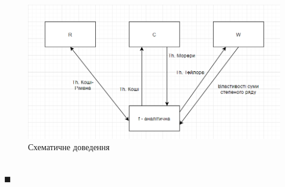 \documentclass[a4paper, 14pt]{extarticle}
\def\hugespace{\vspace{5mm} \\}
\begin{document}
	\begin{figure}[h]
	\includegraphics[scale = 0.7]{Pic.png}
	\caption{Схематичне доведення}
	\end{figure}
	\\
	$\blacksquare$
	\hugespace
	
\end{document}
